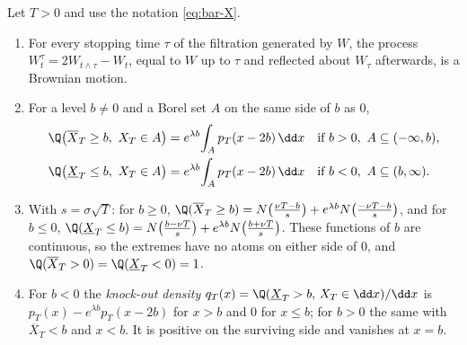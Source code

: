 \begin{theorem}\label{thm:bar-reflection}
Let $T>0$ and use the notation \eqref{eq:bar-X}.
\begin{enumerate}[label=(\roman*)]
  \item For every stopping time $\tau$ of the filtration generated by $W$, the process
    $W^\tau_t=2W_{t\wedge\tau}-W_t$, equal to $W$ up to $\tau$ and reflected about $W_\tau$ afterwards,
    is a Brownian motion.
  \item For a level $b\ne0$ and a Borel set $A$ on the same side of $b$ as $0$,
    \begin{equation}\label{eq:bar-image}
    \begin{aligned}
      \Q\big(\overline X_T\ge b,\ X_T\in A\big)&=e^{\lambda b}\!\int_Ap_T(x-2b)\,\dd x&&\text{if }b>0,\ A\subseteq(-\infty,b),\\
      \Q\big(\underline X_T\le b,\ X_T\in A\big)&=e^{\lambda b}\!\int_Ap_T(x-2b)\,\dd x&&\text{if }b<0,\ A\subseteq(b,\infty).
    \end{aligned}
    \end{equation}
  \item With $s=\sigma\sqrt T$: for $b\ge0$,
    $\Q(\overline X_T\ge b)=N\big(\frac{\nu T-b}{s}\big)+e^{\lambda b}N\big(\frac{-\nu T-b}{s}\big)$, and for
    $b\le0$, $\Q(\underline X_T\le b)=N\big(\frac{b-\nu T}{s}\big)+e^{\lambda b}N\big(\frac{b+\nu T}{s}\big)$.
    These functions of $b$ are continuous, so the extremes have no atoms on either side of $0$,
    and $\Q(\overline X_T>0)=\Q(\underline X_T<0)=1$.
  \item For $b<0$ the \emph{knock-out density}
    $q_T(x)=\Q(\underline X_T>b,\,X_T\in\dd x)/\dd x$ is $p_T(x)-e^{\lambda b}p_T(x-2b)$ for $x>b$ and $0$
    for $x\le b$; for $b>0$ the same with $\overline X_T<b$ and $x<b$. It is positive on the
    surviving side and vanishes at $x=b$.
\end{enumerate}
\end{theorem}

